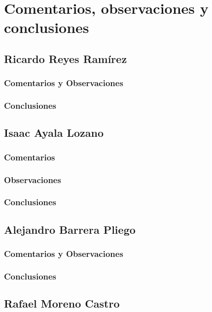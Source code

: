 \section{Comentarios, observaciones y conclusiones}
\subsection{Ricardo Reyes Ram\'irez}
\subsubsection{Comentarios y Observaciones}

\subsubsection{Conclusiones}

\subsection{Isaac Ayala Lozano}
\subsubsection{Comentarios}

\subsubsection{Observaciones}

\subsubsection{Conclusiones}

\subsection{Alejandro Barrera Pliego}
\subsubsection{Comentarios y Observaciones}

\subsubsection{Conclusiones}

\subsection{Rafael Moreno Castro}
